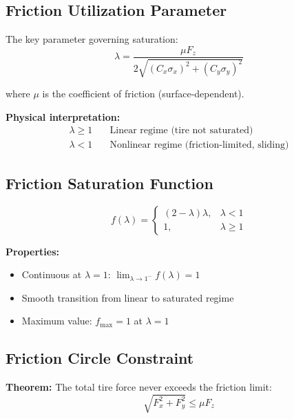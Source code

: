 \documentclass[11pt,a4paper]{article}
\begin{document}
\subsection{Friction Utilization Parameter}

The key parameter governing saturation:
\begin{equation}
\boxed{\lambda = \frac{\mu F_z}{2\sqrt{(C_x \sigma_x)^2 + (C_y \sigma_y)^2}}}
\label{eq:lambda}
\end{equation}

where $\mu$ is the coefficient of friction (surface-dependent).

\textbf{Physical interpretation:}
\begin{align}
\lambda \geq 1 &\quad \text{Linear regime (tire not saturated)} \\
\lambda < 1 &\quad \text{Nonlinear regime (friction-limited, sliding)}
\end{align}

\subsection{Friction Saturation Function}

\begin{equation}
\boxed{f(\lambda) = \begin{cases}
(2 - \lambda)\lambda, & \lambda < 1 \\
1, & \lambda \geq 1
\end{cases}}
\label{eq:saturation}
\end{equation}

\textbf{Properties:}
\begin{itemize}
    \item Continuous at $\lambda = 1$: $\lim_{\lambda \to 1^-} f(\lambda) = 1$
    \item Smooth transition from linear to saturated regime
    \item Maximum value: $f_{\max} = 1$ at $\lambda = 1$
\end{itemize}

\subsection{Friction Circle Constraint}

\textbf{Theorem:} The total tire force never exceeds the friction limit:
\begin{equation}
\sqrt{F_x^2 + F_y^2} \leq \mu F_z
\end{equation}
\end{document}
